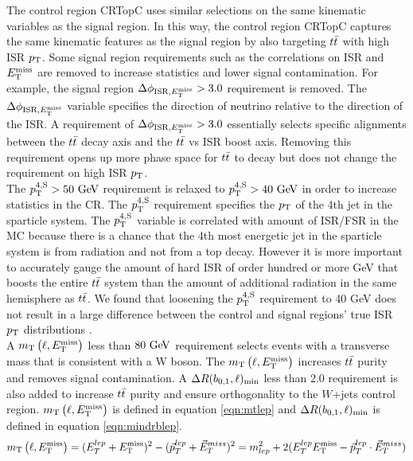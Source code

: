 \indent The control region CRTopC uses similar selections on the same kinematic variables as the signal region.  In this way, the control region CRTopC captures the same kinematic features as the signal region by also targeting $t\bar{t}$ with high ISR $p_{\mathrm{T}}$. Some signal region requirements such as the correlations on ISR and $E_{\mathrm{T}}^{\mathrm{miss}}$ are removed to increase statistics and lower signal contamination.  For example, the signal region $\Delta\phi_{\mathrm{ISR},E_{\mathrm{T}}^{\mathrm{miss}}} > 3.0$ requirement is removed.  The $\Delta\phi_{\mathrm{ISR},E_{\mathrm{T}}^{\mathrm{miss}}}$ variable specifies the direction of neutrino relative to the direction of the ISR.  A requirement of $\Delta\phi_{\mathrm{ISR},E_{\mathrm{T}}^{\mathrm{miss}}}>3.0$ essentially selects specific alignments between the $t\bar{t}$ decay axis and the $t\bar{t}$ vs ISR boost axis.  Removing this requirement opens up more phase space for $t\bar{t}$ to decay but does not change the requirement on high ISR $p_{\mathrm{T}}$. \\

\indent The $\pTjV>50\gev$ requirement is relaxed to $\pTjV>40\gev$ in order to increase statistics in the CR.  The $p_{\mathrm{T}}^{4,\mathrm{S}}$ requirement specifies the $p_{\mathrm{T}}$ of the 4th jet in the sparticle system.  The $p_{\mathrm{T}}^{4,\mathrm{S}}$ variable is correlated with amount of ISR/FSR in the MC because there is a chance that the 4th most energetic jet in the sparticle system is from radiation and not from a top decay.  However it is more important to accurately gauge the amount of hard ISR of order hundred or more GeV that boosts the entire $t\bar{t}$ system than the amount of additional radiation in the same hemisphere as $t\bar{t}$. We found that loosening the $p_{\mathrm{T}}^{4,\mathrm{S}}$ requirement to 40 GeV does not result in a large difference between the control and signal regions' true ISR $p_{\mathrm{T}}$ distributions . \\

\indent   A $m_{\mathrm{T}}\left(\ell,E_{\mathrm{T}}^{\mathrm{miss}}\right)$ less than $80\gev$ requirement selects events with a transverse mass that is consistent with a W boson.  The $m_{\mathrm{T}}\left(\ell,E_{\mathrm{T}}^{\mathrm{miss}}\right)$ increases $t\bar{t}$ purity and removes signal contamination.   A $\Delta R(b_{0,1},\ell)_{\mathrm{min}}$ less than $2.0$ requirement is also added to increase $t\bar{t}$ purity and ensure orthogonality to the $W$+jets control region. $m_{\mathrm{T}}\left(\ell,E_{\mathrm{T}}^{\mathrm{miss}}\right)$ is defined in equation \ref{eqn:mtlep} and $\Delta R(b_{0,1},\ell)_{\mathrm{min}}$ is defined in equation \ref{eqn:mindrblep}. \\

\begin{equation}
m_{\mathrm{T}}\left(\ell,E_{\mathrm{T}}^{\mathrm{miss}}\right) = (E_{T}^{lep}+E_{\mathrm{T}}^{\mathrm{miss}})^{2}-({\vec {p}}_{T}^{lep}+{\vec {E}}_{T}^{miss})^{2} =m_{lep}^{2}+2(E_{T}^{lep}E_{\mathrm{T}}^{\mathrm{miss}}-{\vec {p}}_{T}^{lep}\cdot {\vec {E}}_{T}^{miss})
\label{eqn:mtlep}
\end{equation}

